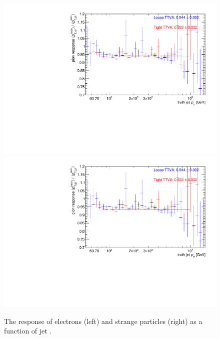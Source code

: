 \begin{figure}
\centering
\includegraphics[scale=0.3, page=5]{figures/jet_comp_study_powheg_Tight_MultiplicityFraction_withLooseandTight.pdf}
\includegraphics[scale=0.3, page=6]{figures/jet_comp_study_powheg_Tight_MultiplicityFraction_withLooseandTight.pdf}
\caption {The response of electrons (left) and strange particles (right) as a function of jet \pT.}
\label{fig:response electron and starnge}
\end{figure}

